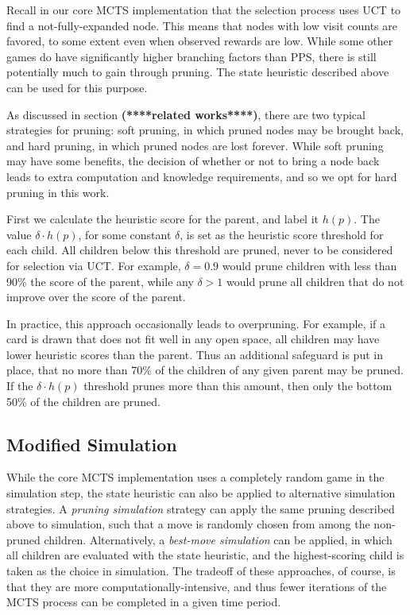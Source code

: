 \documentclass[letterpaper]{article}
\begin{document}
Recall in our core MCTS implementation that the selection process uses UCT to find a not-fully-expanded node. This means that nodes with low visit counts are favored, to some extent even when observed rewards are low. While some other games do have significantly higher branching factors than PPS, there is still potentially much to gain through pruning. The state heuristic described above can be used for this purpose.

As discussed in section {\bf (****related works****)}, there are two typical strategies for pruning: soft pruning, in which pruned nodes may be brought back, and hard pruning, in which pruned nodes are lost forever. While soft pruning may have some benefits, the decision of whether or not to bring a node back leads to extra computation and knowledge requirements, and so we opt for hard pruning in this work.

First we calculate the heuristic score for the parent, and label it $h(p)$. The value $\delta \cdot h(p)$, for some constant $\delta$, is set as the heuristic score threshold for each child. All children below this threshold are pruned, never to be considered for selection via UCT. For example, $\delta = 0.9$ would prune children with less than 90\% the score of the parent, while any $\delta > 1$ would prune all children that do not improve over the score of the parent.

In practice, this approach occasionally leads to overpruning. For example, if a card is drawn that does not fit well in any open space, all children may have lower heuristic scores than the parent. Thus an additional safeguard is put in place, that no more than 70\% of the children of any given parent may be pruned. If the  $\delta \cdot h(p)$ threshold prunes more than this amount, then only the bottom 50\% of the children are pruned.

\subsection{Modified Simulation}

While the core MCTS implementation uses a completely random game in the simulation step, the state heuristic can also be applied to alternative simulation strategies. A {\it pruning simulation} strategy can apply the same pruning described above to simulation, such that a move is randomly chosen from among the non-pruned children. Alternatively, a {\it best-move simulation} can be applied, in which all children are evaluated with the state heuristic, and the highest-scoring child is taken as the choice in simulation. The tradeoff of these approaches, of course, is that they are more computationally-intensive, and thus fewer iterations of the MCTS process can be completed in a given time period. 
\end{document}
